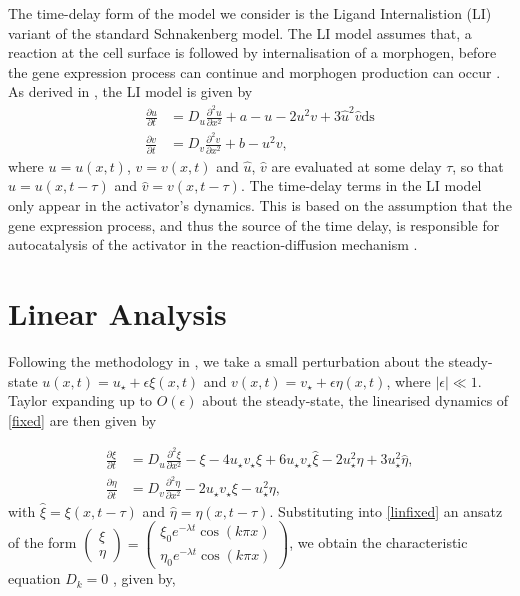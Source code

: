 \documentclass[12pt]{report}
\begin{document}
The time-delay form of the model we consider is the Ligand Internalistion (LI) variant of the standard Schnakenberg model. The LI model assumes that, a reaction at the cell surface is followed by internalisation of a morphogen, before the gene expression process can continue and morphogen production can occur \cite{leegaffney,yigaffneyli}. As derived in \cite{leegaffney}, the LI model is given by
\begin{equation}\label{fixed}
  \begin{split}
  \frac{\partial u}{\partial t}&=D_u\frac{\partial^2u}{\partial x^2}+a-u-2u^2v+3\hat{u}^2\hat{v} \text{ds}\\
  \frac{\partial v}{\partial t}&=D_v\frac{\partial^2v}{\partial x^2}+b-u^2v,
\end{split}
\end{equation}
where $u=u(x,t)$, $v=v(x,t)$ and $\hat{u}$, $\hat{v}$ are evaluated at some delay $\tau$, so that $\hat{u}=u(x,t-\tau)$ and $\hat{v}=v(x,t-\tau)$. The time-delay terms in the LI model only appear in the activator's dynamics. This is based on the assumption that the gene expression process, and thus the source of the time delay, is responsible for autocatalysis of the activator in the reaction-diffusion mechanism \cite{gaffmonk}.
\section{Linear Analysis}
Following the methodology in \cite{yigaffneyli}, we take a small perturbation about the steady-state $u(x,t)=u_\star+\epsilon\xi(x,t)$ and $v(x,t)=v_\star+\epsilon\eta(x,t)$, where $|\epsilon|\ll 1$. Taylor expanding up to $O(\epsilon)$ about the steady-state, the linearised dynamics of \eqref{fixed} are then given by

\begin{equation}\label{linfixed}
  \begin{split}
\frac{\partial\xi}{\partial t}&=D_u\frac{\partial^2\xi}{\partial x^2}-\xi-4u_\star v_\star\xi+6u_\star v_\star\hat{\xi}-2u_\star^2\eta+3u_\star^2\hat{\eta},\\
\frac{\partial\eta}{\partial t}&=D_v\frac{\partial^2\eta}{\partial x^2}-2u_\star v_\star\xi-u_\star^2\eta,
\end{split}
\end{equation}
with $\hat{\xi}=\xi(x,t-\tau)$ and $\hat{\eta}=\eta(x,t-\tau)$. Substituting into \eqref{linfixed} an ansatz of the form $\begin{pmatrix}\xi\\\eta\end{pmatrix}=\begin{pmatrix}\xi_0e^{-\lambda t}\cos(k\pi x)\\ \eta_0e^{-\lambda t}\cos(k\pi x)\end{pmatrix}$, we obtain the characteristic equation $D_k=0$ \cite{yigaffneyli}, given by,
\end{document}
